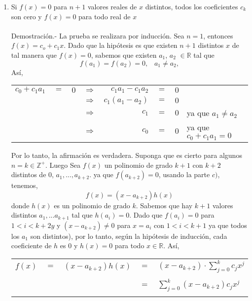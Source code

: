\begin{enumerate}
\begin{enumerate}[\bfseries (a)]
                \item Si $f(x)=0$ para $n+1$ valores reales de $x$ distintos, todos los coeficientes $c_k$ son cero y $f(x)=0$ para todo real de $x$\\\\
                Demostración.- \;  La prueba se realizara por inducción. Sea $n=1$, entonces $f(x)=c_o + c_1 x$. Dado que la hipótesis es que existen $n+1$ distintos  $x$ de tal manera que $f(x)=0$, sabemos que existen $a_1$, $a_2$ $\in \mathbb{R}$ tal que $$f(a_1)=f(a_2)=0, \; \; \; a_1 \neq a_2,$$ Así, 
                    \begin{center}
                        \begin{tabular}{r c l c r c l l}
                            $c_0 + c_1 a_1$&$=$&$0$&$\Rightarrow$&$c_1 a_1 - c_1 a_2$&$=$&$0$&\\
                            &&&$\Rightarrow$&$c_1(a_1 - a_2)$&$=$&$0$&\\
                            &&&$\Rightarrow$&$c_1$&$=$&$0$& ya que $a_1 \neq a_2$\\
                            &&&$\Rightarrow$&$c_0$&$=$&$0$&ya que $c_0 + c_1 a_1 = 0$\\
                        \end{tabular}
                    \end{center}
                Por lo tanto, la afirmación es verdadera. Suponga que es cierto para algunos $n=k \in \mathbb{Z}^{+}$. Luego Sea $f(x)$ un polinomio de grado $k+1$ con $k+2$ distintos de $0$, $a_1,...,a_{k+2}.$ ya que $f(a_{k+2}) = 0$, usando la parte $c)$, tenemos, $$f(x)=(x- a_{k+2})h(x)$$
                donde $h(x)$ es un polinomio de grado $k$. Sabemos que hay $k+1$ valores distintos $a_1,... a_{k+1}$ tal que  $h(a_i) = 0.$ Dado que $f(a_i)=0$ para $1< i < k+2y$ y $(x- a_{k+2}) \neq 0$ para $x=a_i$ con $1 < i < k+1$ ya que todos los $a_1$ son distintos), por lo tanto, según la hipótesis de inducción, cada coeficiente de $h$ es $0$ y $h(x)=0$ para todo $x \in \mathbb{R}.$ Así,
                    \begin{center}
                        \begin{tabular}{r c r c l}
                            $f(x)$&$=$&$(x - a_{k+2})h(x)$&$=$&$(x- a_{k+2}) \cdot \displaystyle\sum_{j=0}^k c_j x^j$\\\\
                            &&&$=$&$\displaystyle\sum_{j=0}^k (x - a_{k+2})c_j x^j$\\\\

\end{tabular}
\end{center}
\end{enumerate}
\end{enumerate}
